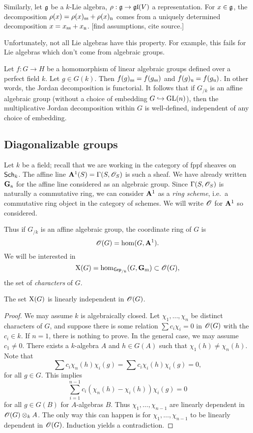 Similarly, let $\mathfrak{g}$ be a $k$-Lie algebra, $\rho:\mathfrak{g}\to \mathfrak{gl}(V)$ a 
representation. For $x\in \mathfrak{g}$, the decomposition 
$\rho(x)=\rho(x)_{\mathrm{ss}}+\rho(x)_{\mathrm{n}}$ comes from a uniquely 
determined decomposition $x=x_{\mathrm{ss}}+x_{\mathrm{n}}$. [find assumptions, 
cite source.]

Unfortunately, not all Lie algebras have this property. For example, this fails 
for Lie algebras which don't come from algebraic groups. 

Let $f:G\to H$ be a homomorphism of linear algebraic groups defined over a 
perfect field $k$. Let $g\in G(k)$. Then 
$f(g)_{\mathrm{ss}}=f(g_{\mathrm{ss}})$ and $f(g)_{\mathrm{u}}=f(g_{\mathrm{u}})$. 
In other words, the Jordan decomposition is functorial. 
It follows that if $G_{/k}$ is an affine algebraic group (without a choice of 
embedding $G\hookrightarrow \operatorname{GL}(n)$), then the multiplicative Jordan 
decomposition within $G$ is well-defined, independent of any choice of 
embedding. 





\subsection{Diagonalizable groups}

Let $k$ be a field; recall that we are working in the category of fppf sheaves 
on $\mathsf{Sch}_{k}$. The affine line $\mathbf{A}^1(S)=\Gamma(S,\mathscr{O}_S)$ is such a sheaf. 
We have already written $\mathbf{G}_\mathrm{a}$ for the affine line considered as an algebraic 
group. Since $\Gamma(S,\mathscr{O}_S)$ is naturally a commutative ring, we can consider 
$\mathbf{A}^1$ as a \emph{ring scheme}, i.e.~a commutative ring object in the category 
of schemes. We will write $\mathscr{O}$ for $\mathbf{A}^1$ so considered. 

Thus if $G_{/k}$ is an affine algebraic group, the coordinate ring of $G$ is 
\[
  \mathscr{O}(G)=\hom(G,\mathbf{A}^1) .
\]
We will be interested in 
\[
  \operatorname{X}(G) = \hom_{\mathsf{Grp}_{/k}}(G,\mathbf{G}_\mathrm{m}) \subset \mathscr{O}(G) ,
\]
the set of \emph{characters} of $G$. 

\begin{lemma}
The set $\operatorname{X}(G)$ is linearly independent in $\mathscr{O}(G)$. 
\end{lemma}
\begin{proof}
We may assume $k$ is algebraically closed. Let $\chi_1,\dots,\chi_n$ be 
distinct characters of $G$, and suppose there is some relation 
$\sum c_i \chi_i=0$ in $\mathscr{O}(G)$ with the $c_i\in k$. If $n=1$, there is 
nothing to prove. In the general case, we may assume $c_1\ne 0$. There exists 
a $k$-algebra $A$ and $h\in G(A)$ such that $\chi_1(h)\ne \chi_n(h)$. Note 
that 
\[
  \sum c_i \chi_n(h)\chi_i(g) = \sum c_i \chi_i(h) \chi_i(g) = 0 ,
\]
for all $g\in G$. This implies 
\[
  \sum_{i=1}^{n-1} c_i(\chi_n(h)-\chi_i(h)) \chi_i(g) = 0 
\]
for all $g\in G(B)$ for $A$-algebras $B$. 
Thus $\chi_1,\dots,\chi_{n-1}$ are linearly dependent in 
$\mathscr{O}(G)\otimes_k A$. The only way this can happen is for 
$\chi_1,\dots,\chi_{n-1}$ to be linearly dependent in $\mathscr{O}(G)$. Induction 
yields a contradiction. 
\end{proof}

